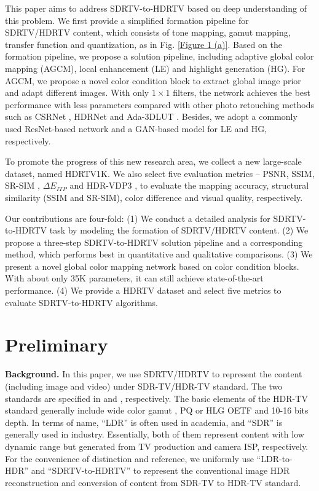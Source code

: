 \documentclass[10pt,twocolumn,letterpaper]{article}
\begin{document}
This paper aims to address SDRTV-to-HDRTV based on deep understanding of this problem. We first provide a simplified formation pipeline for SDRTV/HDRTV content, which consists of tone mapping, gamut mapping, transfer function and quantization, as in Fig. \ref{Figure 1 (a)}. Based on the formation pipeline, we propose a solution pipeline, including adaptive global color mapping (AGCM), local enhancement (LE) and highlight generation (HG). For AGCM, we propose a novel color condition block to extract global image prior and adapt different images. With only $1\times1$ filters, the network achieves the best performance with less parameters compared with other photo retouching methods such as CSRNet \cite{he2020conditional}, HDRNet \cite{gharbi2017deep} and Ada-3DLUT \cite{zeng2020learning}. Besides, we adopt a commonly used ResNet-based network and a GAN-based model for LE and HG, respectively.

To promote the progress of this new research area, we collect a new large-scale dataset, named HDRTV1K. We also select five evaluation metrics -- PSNR, SSIM, SR-SIM \cite{zhang2012sr}, $\Delta E_{ITP}$ \cite{ITP} and HDR-VDP3 \cite{mantiuk2011hdr}, to evaluate the mapping accuracy, structural similarity (SSIM and SR-SIM), color difference and visual quality, respectively.

Our contributions are four-fold: (1) We conduct a detailed analysis for SDRTV-to-HDRTV task by modeling the formation of SDRTV/HDRTV content. (2) We propose a three-step SDRTV-to-HDRTV solution pipeline and a corresponding method, which performs best in quantitative and qualitative comparisons. (3) We present a novel global color mapping network based on color condition blocks. With about only 35K parameters, it can still achieve state-of-the-art performance. (4) We provide a HDRTV dataset and select five metrics to evaluate SDRTV-to-HDRTV algorithms.

\vspace{-3pt}
\section{Preliminary}
\label{Preliminary}
\textbf{Background.} In this paper, we use SDRTV/HDRTV to represent the content (including image and video) under SDR-TV/HDR-TV standard. The two standards are specified in \cite{rec709, BT1886} and \cite{rec2020, bt2100}, respectively. The basic elements of the HDR-TV standard generally include wide color gamut \cite{rec2020}, PQ or HLG OETF \cite{bt2100} and 10-16 bits depth. In terms of name, ``LDR'' is often used in academia, and ``SDR'' is generally used in industry. Essentially, both of them represent content with low dynamic range but generated from TV production and camera ISP, respectively. For the convenience of distinction and reference, we uniformly use ``LDR-to-HDR'' and ``SDRTV-to-HDRTV'' to represent the conventional image HDR reconstruction and conversion of content from SDR-TV to HDR-TV standard.
\end{document}
